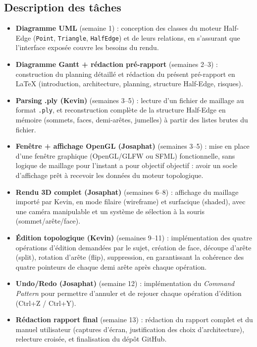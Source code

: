 \subsection{Description des tâches}

\begin{itemize}
	\item \textbf{Diagramme UML} (semaine 1) : conception des classes
	du moteur Half-Edge (\texttt{Point}, \texttt{Triangle},
	\texttt{HalfEdge}) et de leurs relations, en s'assurant que
	l'interface exposée couvre les besoins du rendu.
	
	\item \textbf{Diagramme Gantt + rédaction pré-rapport}
	(semaines 2--3) : construction du planning détaillé et rédaction
	du présent pré-rapport en \LaTeX{} (introduction, architecture,
	planning, structure Half-Edge, risques).
	
	\item \textbf{Parsing .ply (Kevin)} (semaines 3--5) : lecture
	d'un fichier de maillage au format \texttt{.ply}, et
	reconstruction complète de la structure Half-Edge en mémoire
	(sommets, faces, demi-arêtes, jumelles) à partir des listes
	brutes du fichier.
	
	\item \textbf{Fenêtre + affichage OpenGL (Josaphat)}
	(semaines 3--5) : mise en place d'une fenêtre graphique
	(OpenGL/GLFW ou SFML) fonctionnelle, sans logique de maillage
	pour l'instant a pour objectif objectif : avoir un socle d'affichage prêt à
	recevoir les données du moteur topologique.
	
	\item \textbf{Rendu 3D complet (Josaphat)} (semaines 6--8) :
	affichage du maillage importé par Kevin, en mode filaire
	(wireframe) et surfacique (shaded), avec une caméra manipulable
	et un système de sélection à la souris (sommet/arête/face).
	
	\item \textbf{Édition topologique (Kevin)} (semaines 9--11) :
	implémentation des quatre opérations d'édition demandées par le
	sujet, création de face, découpe d'arête (split), rotation
	d'arête (flip), suppression, en garantissant la cohérence des
	quatre pointeurs de chaque demi arête après chaque opération.
	
	\item \textbf{Undo/Redo (Josaphat)} (semaine 12) :
	implémentation du \emph{Command Pattern} pour permettre
	d'annuler et de rejouer chaque opération d'édition
	(Ctrl+Z / Ctrl+Y).
	
	\item \textbf{Rédaction rapport final} (semaine 13) : rédaction
	du rapport complet et du manuel utilisateur (captures d'écran,
	justification des choix d'architecture), relecture croisée, et
	finalisation du dépôt GitHub.
\end{itemize}

